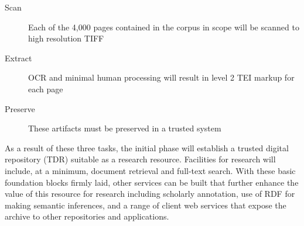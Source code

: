 \begin{description}
  \item[Scan]{Each of the 4,000 pages contained in the corpus in scope will be scanned to high resolution TIFF}
  \item[Extract]{OCR and minimal human processing will result in level 2 TEI\cite{tei_sig_on_libraries_best_2011} markup for each page}
  \item[Preserve]{These artifacts must be preserved in a trusted system}
\end{description}

As a result of these three tasks, the initial phase will establish a trusted digital repository (TDR) suitable as a research resource. Facilities for research will include, at a minimum, document retrieval and full-text search. With these basic foundation blocks firmly laid, other services can be built that further enhance the value of this resource for research including scholarly annotation, use of RDF for making semantic inferences, and a range of client web services that expose the archive to other repositories and applications.